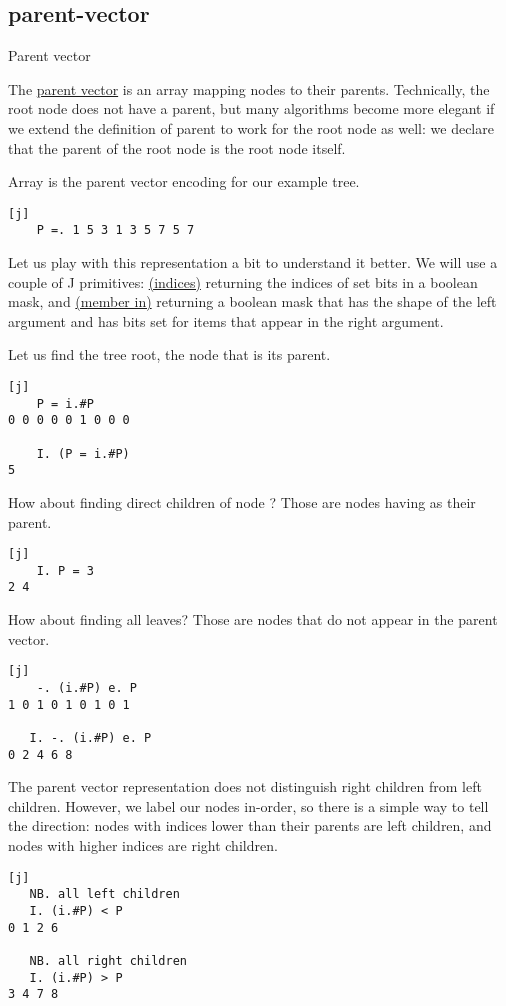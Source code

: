 \documentclass{article}
\begin{document}
\subsection{parent-vector}{Parent vector}

The \href{https://dl.acm.org/doi/10.1145/586058.586060}{parent vector} is an array mapping nodes to their parents.
Technically, the root node does not have a parent, but many algorithms become more elegant if we extend the definition of parent to work for the root node as well: we declare that the parent of the root node is the root node itself.

Array  is the parent vector encoding for our example tree.
\begin{verbatim}[j]
    P =. 1 5 3 1 3 5 7 5 7
\end{verbatim}

Let us play with this representation a bit to understand it better.
We will use a couple of J primitives: \href{https://code.jsoftware.com/wiki/Vocabulary/icapdot}{ (indices)} returning the indices of set bits in a boolean mask, and \href{https://code.jsoftware.com/wiki/Vocabulary/edot#dyadic}{ (member in)} returning a boolean mask that has the shape of the left argument and has bits set for items that appear in the right argument.

Let us find the tree root, the node that is its parent.
\begin{verbatim}[j]
    P = i.#P
0 0 0 0 0 1 0 0 0

    I. (P = i.#P)
5
\end{verbatim}

How about finding direct children of node ?
Those are nodes having  as their parent.
\begin{verbatim}[j]
    I. P = 3
2 4
\end{verbatim}

How about finding all leaves?
Those are nodes that do not appear in the parent vector.
\begin{verbatim}[j]
    -. (i.#P) e. P
1 0 1 0 1 0 1 0 1

   I. -. (i.#P) e. P
0 2 4 6 8
\end{verbatim}

The parent vector representation does not distinguish right children from left children.
However, we label our nodes in-order, so there is a simple way to tell the direction: nodes with indices lower than their parents are left children, and nodes with higher indices are right children.
\begin{verbatim}[j]
   NB. all left children
   I. (i.#P) < P
0 1 2 6

   NB. all right children
   I. (i.#P) > P
3 4 7 8
\end{verbatim}
\end{document}

